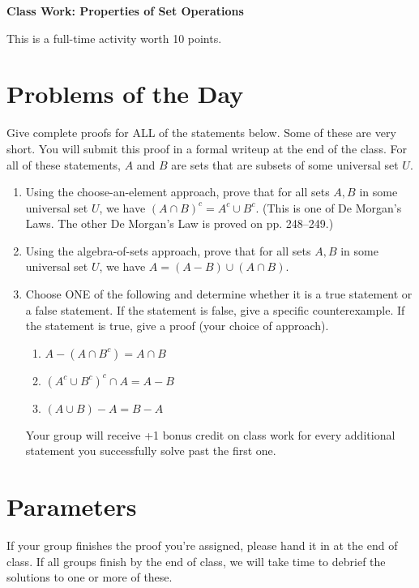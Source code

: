 \documentclass[11pt]{article}
\begin{document}
	
	\thispagestyle{empty}
	\renewcommand{\headrulewidth}{0.0pt}
	\thispagestyle{fancy}
	\lfoot{}
	\cfoot{}
	\rfoot{}	
	
	\vspace*{0in}

		\begin{center}
			\begin{large}
			\textbf{Class Work: Properties of Set Operations} \\
			\end{large}
			This is a full-time activity worth 10 points. 
			
		\end{center}
		

\section*{Problems of the Day}

Give complete proofs for ALL of the statements below. Some of these are very short. You will submit this proof in a formal writeup at the end of the class. For all of these statements, $A$ and $B$ are sets that are subsets of some universal set $U$. 

\begin{enumerate}
	\item Using the choose-an-element approach, prove that for all sets $A,B$ in some universal set $U$, we have $(A \cap B)^c = A^c \cup B^c$. (This is one of De Morgan's Laws. The other De Morgan's Law is proved on pp. 248--249.) 
	\item Using the algebra-of-sets approach, prove that  for all sets $A,B$ in some universal set $U$, we have  $A = (A-B) \cup (A \cap B)$.
	
	\item Choose ONE of the following and determine whether it is a true statement or a false statement. If the statement is false, give a specific counterexample. If the statement is true, give a proof (your choice of approach). 
	\begin{enumerate}
		\item $A - (A \cap B^c) = A \cap B$
		\item $(A^c \cup B^c)^c \cap A = A - B$
		\item $(A \cup B) - A = B - A$
	\end{enumerate}
Your group will receive +1 bonus credit on class work for every additional statement you successfully solve past the first one. 
	
	 
	
\end{enumerate}

\section*{Parameters}

If your group finishes the proof you're assigned, please hand it in at the end of class. If all groups finish by the end of class, we will take time to debrief the solutions to one or more of these. 
\end{document}
